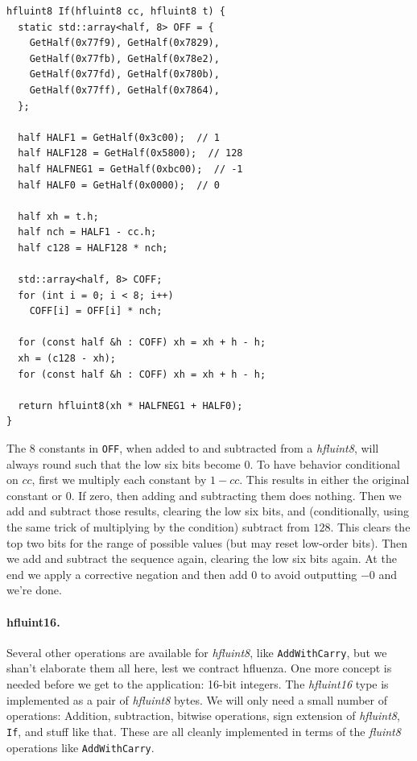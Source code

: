 \documentclass[twocolumn]{article}
\begin{document}

\begin{lstlisting}
hfluint8 If(hfluint8 cc, hfluint8 t) {
  static std::array<half, 8> OFF = {
    GetHalf(0x77f9), GetHalf(0x7829),
    GetHalf(0x77fb), GetHalf(0x78e2),
    GetHalf(0x77fd), GetHalf(0x780b),
    GetHalf(0x77ff), GetHalf(0x7864),
  };

  half HALF1 = GetHalf(0x3c00);  // 1
  half HALF128 = GetHalf(0x5800);  // 128
  half HALFNEG1 = GetHalf(0xbc00);  // -1
  half HALF0 = GetHalf(0x0000);  // 0

  half xh = t.h;
  half nch = HALF1 - cc.h;
  half c128 = HALF128 * nch;

  std::array<half, 8> COFF;
  for (int i = 0; i < 8; i++)
    COFF[i] = OFF[i] * nch;

  for (const half &h : COFF) xh = xh + h - h;
  xh = (c128 - xh);
  for (const half &h : COFF) xh = xh + h - h;

  return hfluint8(xh * HALFNEG1 + HALF0);
}
\end{lstlisting}

The 8 constants in \verb+OFF+, when added to and subtracted from a
{\it hfluint8}, will always round such that the low six bits become
$0$. To have behavior conditional on $cc$, first we multiply each
constant by $1 - cc$. This results in either the original constant or
$0$. If zero, then adding and subtracting them does nothing. Then we
add and subtract those results, clearing the low six bits, and
(conditionally, using the same trick of multiplying by the condition)
subtract from $128$. This clears the top two bits for the range of
possible values (but may reset low-order bits). Then we add and
subtract the sequence again, clearing the low six bits again. At the
end we apply a corrective negation and then add $0$ to avoid
outputting $-0$ and we're done.

\paragraph{hfluint16.}
Several other operations are available for {\it hfluint8}, like
\verb+AddWithCarry+, but we shan't elaborate them all here, lest we
contract hfluenza. One more concept is needed before we get to the
application: 16-bit integers. The {\it hfluint16} type is implemented
as a pair of {\it hfluint8} bytes. We will only need a small number of
operations: Addition, subtraction, bitwise operations, sign extension
of {\it hfluint8}, \verb+If+, and stuff like that. These are all
cleanly implemented in terms of the {\it fluint8} operations like
\verb+AddWithCarry+.
\end{document}
